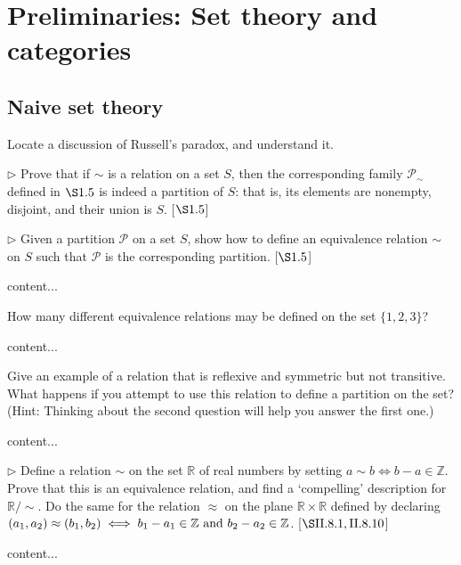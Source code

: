 \chapter{Preliminaries: Set theory and categories}
	\section{Naive set theory}
	\extitle
	\begin{exercise}
		Locate a discussion of Russell's paradox, and understand it.
	\end{exercise}
	\begin{solution}
	\end{solution}
	\begin{exercise}
		$\triangleright$ Prove that if $\sim$ is a relation on a set $S$, then the corresponding family $\mathscr{P}_{\sim}$ defined in $\S1.5$  is indeed a partition of $S$: that is, its elements are nonempty, disjoint, and their union is $S$. [$\S1.5$]
	\end{exercise}
	\begin{solution}
	\end{solution}
	\begin{exercise}
		$\triangleright$ Given a partition $\mathscr{P}$ on a set $S$, show how to define an equivalence relation $\sim$ on $S$ such that $\mathscr{P}$ is the corresponding partition. [$\S1.5$]
	\end{exercise}
	\begin{solution}
		content...
	\end{solution}
	\begin{exercise}
		How many different equivalence relations may be defined on the set $\{1,2,3\}$?
	\end{exercise}
	\begin{solution}
		content...
	\end{solution}
	\begin{exercise}
		Give an example of a relation that is reflexive and symmetric but not transitive. What happens if you attempt to use this relation to define a partition on the set? (Hint: Thinking about the second question will help you answer the first one.)
	\end{exercise}
	\begin{solution}
		content...
	\end{solution}
	\begin{exercise}
		$\triangleright$ Define a relation $\sim$ on the set $\mathbb{R}$ of real numbers by setting $a \sim b \iff b-a\in \mathbb{Z}$. Prove that this is an equivalence relation, and find a `compelling' description for $\mathbb{R}/{\sim}$. Do the same for the relation $\approx$ on the plane $\mathbb{R} \times \mathbb{R}$ defined by declaring $(a_1,a_2) \approx (b_1,b_2) \iff b_1 - a_1 \in \mathbb{Z}\textnormal{ and }b_2 - a_2\in\mathbb{Z}$. [$\S \RN{2}.8.1,\RN{2}.8.10$]
	\end{exercise}
	\begin{solution}
		content...
	\end{solution}